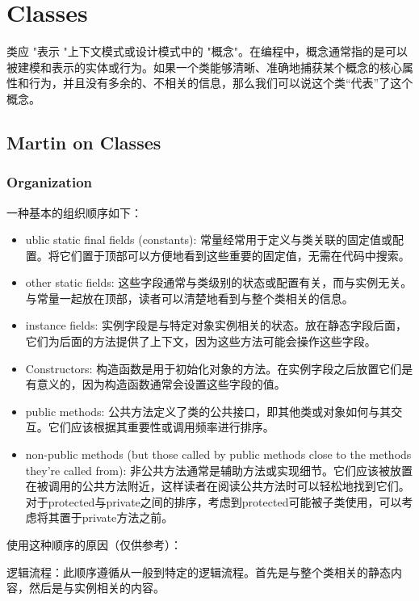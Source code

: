 \chapter{Classes}

类应 "表示 "上下文模式或设计模式中的 "概念"。在编程中，概念通常指的是可以被建模和表示的实体或行为。如果一个类能够清晰、准确地捕获某个概念的核心属性和行为，并且没有多余的、不相关的信息，那么我们可以说这个类“代表”了这个概念。

\section{Martin on Classes}
\subsection{Organization}
一种基本的组织顺序如下：
\begin{itemize}
    \item ublic static final fields (constants):
          常量经常用于定义与类关联的固定值或配置。将它们置于顶部可以方便地看到这些重要的固定值，无需在代码中搜索。
    \item other static fields:
          这些字段通常与类级别的状态或配置有关，而与实例无关。与常量一起放在顶部，读者可以清楚地看到与整个类相关的信息。

    \item instance fields:
          实例字段是与特定对象实例相关的状态。放在静态字段后面，它们为后面的方法提供了上下文，因为这些方法可能会操作这些字段。

    \item Constructors:
          构造函数是用于初始化对象的方法。在实例字段之后放置它们是有意义的，因为构造函数通常会设置这些字段的值。

    \item public methods:
          公共方法定义了类的公共接口，即其他类或对象如何与其交互。它们应该根据其重要性或调用频率进行排序。

    \item non-public methods (but those called by public methods close to the methods they're called from):
          非公共方法通常是辅助方法或实现细节。它们应该被放置在被调用的公共方法附近，这样读者在阅读公共方法时可以轻松地找到它们。对于protected与private之间的排序，考虑到protected可能被子类使用，可以考虑将其置于private方法之前。
\end{itemize}

使用这种顺序的原因（仅供参考）：

逻辑流程：此顺序遵循从一般到特定的逻辑流程。首先是与整个类相关的静态内容，然后是与实例相关的内容。


